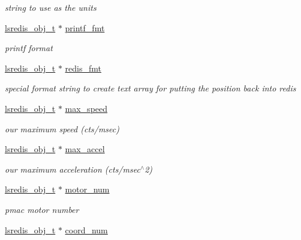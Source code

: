 \begin{DoxyCompactItemize}
\begin{DoxyCompactList}\small\item\em string to use as the units \end{DoxyCompactList}\item 
\hyperlink{pgpmac_8h_ad449de06d02791adf2498d2a1e1f909c}{lsredis\-\_\-obj\-\_\-t} $\ast$ \hyperlink{structlspmac__motor__struct_a25b13b65baf1b28c34012850809b0a3a}{printf\-\_\-fmt}
\begin{DoxyCompactList}\small\item\em printf format \end{DoxyCompactList}\item 
\hyperlink{pgpmac_8h_ad449de06d02791adf2498d2a1e1f909c}{lsredis\-\_\-obj\-\_\-t} $\ast$ \hyperlink{structlspmac__motor__struct_a91c38b2072d878b71f4e77de2f1375a4}{redis\-\_\-fmt}
\begin{DoxyCompactList}\small\item\em special format string to create text array for putting the position back into redis \end{DoxyCompactList}\item 
\hyperlink{pgpmac_8h_ad449de06d02791adf2498d2a1e1f909c}{lsredis\-\_\-obj\-\_\-t} $\ast$ \hyperlink{structlspmac__motor__struct_a69e49769a1001665377efc7193d88a0a}{max\-\_\-speed}
\begin{DoxyCompactList}\small\item\em our maximum speed (cts/msec) \end{DoxyCompactList}\item 
\hyperlink{pgpmac_8h_ad449de06d02791adf2498d2a1e1f909c}{lsredis\-\_\-obj\-\_\-t} $\ast$ \hyperlink{structlspmac__motor__struct_a50cf4c0711cea164e332bc34705a1a68}{max\-\_\-accel}
\begin{DoxyCompactList}\small\item\em our maximum acceleration (cts/msec$^\wedge$2) \end{DoxyCompactList}\item 
\hyperlink{pgpmac_8h_ad449de06d02791adf2498d2a1e1f909c}{lsredis\-\_\-obj\-\_\-t} $\ast$ \hyperlink{structlspmac__motor__struct_ad6a51cca3c7e5f79168e5c33fd9e736b}{motor\-\_\-num}
\begin{DoxyCompactList}\small\item\em pmac motor number \end{DoxyCompactList}\item 
\hyperlink{pgpmac_8h_ad449de06d02791adf2498d2a1e1f909c}{lsredis\-\_\-obj\-\_\-t} $\ast$ \hyperlink{structlspmac__motor__struct_a5614e003272e8323f8809bf7b6559532}{coord\-\_\-num}

\end{DoxyCompactItemize}
